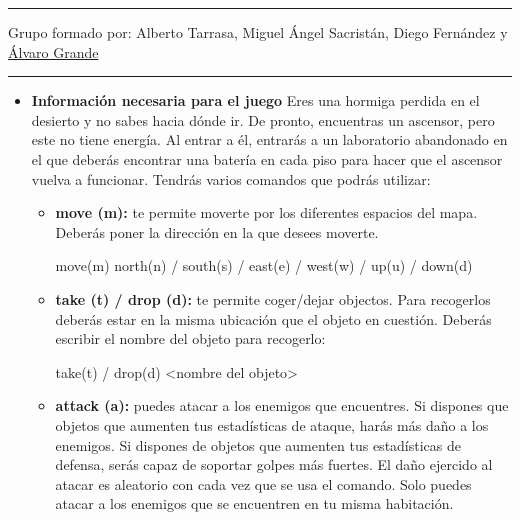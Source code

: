 \documentclass[10.9pt,a4paper]{article}
\date{ }
\newcounter{ex}
\begin{document}
\hrule \vskip 1mm

\begin{center}
  \quad {}

  \vskip 2mm
  \hfill Grupo formado por: Alberto Tarrasa, Miguel Ángel Sacristán, Diego Fernández y \underline {Álvaro Grande}
  \vskip 3mm \hrule
\end{center}

\begin{itemize}
  \item  \textbf{Información necesaria para el juego} \vskip 2mm
        Eres una hormiga perdida en el desierto y no sabes hacia dónde ir. De pronto, encuentras un ascensor, pero este no tiene energía. Al entrar a él, entrarás a un laboratorio abandonado en el que deberás encontrar una batería en cada piso para hacer que el ascensor vuelva a funcionar. Tendrás varios comandos que podrás utilizar:

        \begin{itemize}
          \item \textbf{move (m):} te permite moverte por los diferentes espacios del mapa. Deberás poner la dirección en la que desees moverte.

                \begin{center}
                  move(m) north(n) / south(s) / east(e) / west(w) / up(u) / down(d)
                \end{center}

          \item \textbf{take (t) / drop (d):} te permite coger/dejar objectos. Para recogerlos deberás estar en la misma ubicación que el objeto en cuestión. Deberás escribir el nombre del objeto para recogerlo:

                \begin{center}
                  take(t) / drop(d) <nombre del objeto>
                \end{center}

          \item \textbf{attack (a):} puedes atacar a los enemigos que encuentres. Si dispones que objetos que aumenten tus estadísticas de ataque, harás más daño a los enemigos. Si dispones de objetos que aumenten tus estadísticas de defensa, serás capaz de soportar golpes más fuertes. El daño ejercido al atacar es aleatorio con cada vez que se usa el comando. Solo puedes atacar a los enemigos que se encuentren en tu misma habitación.


\end{itemize}
\end{itemize}
\end{document}
